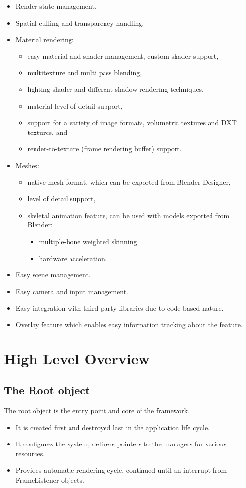 \begin{itemize}
\item Render state management.
\item Spatial culling and transparency handling.
\item Material rendering:
\begin{itemize}
  \item easy material and shader management, custom shader support,
  \item multitexture and multi pass blending,
  \item lighting shader and different shadow rendering techniques,
  \item material level of detail support,
  \item support for a variety of image formats, volumetric textures and DXT textures, and
  \item render-to-texture (frame rendering buffer) support.
\end{itemize}
\item Meshes:
\begin{itemize}
  \item native mesh format, which can be exported from Blender Designer,
  \item level of detail support,
  \item skeletal animation feature, can be used with models exported from Blender:
\begin{itemize}
  \item multiple-bone weighted skinning
  \item hardware acceleration.
\end{itemize}
\end{itemize}
\item Easy scene management.
\item Easy camera and input management.
\item Easy integration with third party libraries due to code-based nature.
\item Overlay feature which enables easy information tracking about the feature.
\end{itemize}

\section{High Level Overview}
\subsection{The Root object}
The root object is the entry point and core of the framework.
\begin{itemize}
\item It is created first and destroyed last in the application life cycle. 
\item It configures the system, delivers pointers to the managers for various resources.
\item Provides automatic rendering cycle, continued until an interrupt from FrameListener objects.
\end{itemize}

